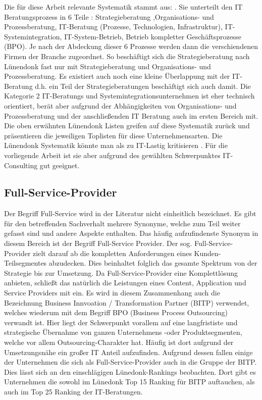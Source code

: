 Die für diese Arbeit relevante Systematik stammt aus: \cite[56]{Lippold201309}. Sie unterteilt den IT Beratungsprozess in 6 Teile :  Strategieberatung ,Organisations- und Prozessberatung, IT-Beratung (Prozesse, Technologien, Infrastruktur), IT-Systemintegration, IT-System-Betrieb, Betrieb kompletter Geschäftsprozesse (BPO). Je nach der Abdeckung dieser 6 Prozesse werden dann die verschiendenen Firmen der Branche zugeordnet. So beschäftigt sich die Strategieberatung nach Lünendonk fast nur mit Strategieberatung und Organisations- und Prozessberatung. Es existiert auch noch eine kleine Überlappung mit der IT-Beratung d.h. ein Teil der Strategieberatungen beschäftigt sich auch damit. Die Kategorie 2 IT-Beratungs und Systemintegrationsunternehmen ist eher technisch orientiert, berät aber aufgrund der Abhängigkeiten von Organisations- und Prozessberatung und der anschließenden IT Beratung auch im ersten Bereich mit. Die oben erwähnten Lünendonk Listen greifen auf diese Systematik zurück und präsentieren die jeweiligen \glqq Toplisten \grqq für diese Unternehmensarten. Die Lünendonk Systematik könnte man als zu IT-Lastig kritisieren \cite[56]{Lippold201309} . Für die vorliegende Arbeit ist sie aber aufgrund des gewählten Schwerpunktes
IT- Consulting gut geeignet.

\subsection{Full-Service-Provider}
Der Begriff Full-Service wird in der Literatur nicht einheitlich bezeichnet. Es gibt für den betreffenden Sachverhalt mehrere Synonyme, welche zum Teil weiter gefasst sind und andere Aspekte enthalten. Das häufig aufzufindenste Synonym in diesem Bereich ist der Begriff Full-Service Provider.
Der sog. \glqq Full-Service-Provider \grqq zielt darauf ab die kompletten Anforderungen eines Kunden-Teilsegmentes abzudecken. \cite[124]{WeillVitale200106} Dies beinhaltet folglich das gesamte Spektrum von der Strategie bis zur Umsetzung. Da Full-Service-Provider eine Komplettlösung anbieten, schließt das natürlich die Leistungen eines Content, Application und Service Providers mit ein. \cite[83]{Thalmann200708}
Es wird in diesem Zusammenhang auch die Bezeichnung Business Innvoation / Transformation Partner (BITP) verwendet, welches wiederum mit dem Begriff BPO (Business Process Outsourcing) verwandt ist. Hier liegt der Schwerpunkt vorallem auf eine langfrististe und strategische Übernahme von ganzen Unternehmens -oder Produktsegmenten, welche vor allem Outsourcing-Charakter hat.\cite[163]{Pohland200908} Häufig ist dort aufgrund der Umsetzungsnähe ein großer IT Anteil aufzufinden. Aufgrund dessen fallen einige der Unternehmen die sich als Full-Service-Provider auch in die Gruppe der BITP. Dies lässt sich an den einschlägigen Lünedonk-Rankings beobachten. Dort gibt es Unternehmen die sowohl im Lünedonk Top 15 Ranking für BITP auftauchen, als auch im Top 25 Ranking der IT-Beratungen.\cite {topBITP} \cite {topITB}

